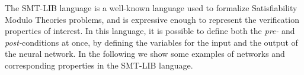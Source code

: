 The SMT-LIB language is a well-known language used to formalize 
Satisfiability Modulo Theories problems, and is expressive enough to
represent the verification properties of interest. In this language, 
it is possible to define both the \textit{pre-} and 
\textit{post-}conditions at once, by defining the variables for the
input and the output of the neural network. In the following we
show some examples of networks and corresponding properties in the
SMT-LIB language.

